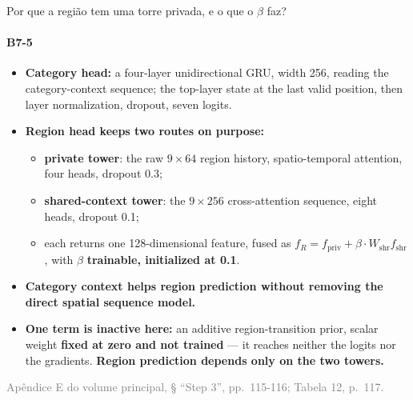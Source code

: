 \documentclass{beamer}
\begin{document}
\begin{frame}[noframenumbering]{Por que a região tem uma torre privada, e o que o $\beta$ faz?}
    \framesubtitle{B7-5}
    \hypertarget{b75}{}
    \small\begin{itemize}\setlength{\itemsep}{0pt}\setlength{\parskip}{0pt}
        \item \textbf{Category head:} a four-layer unidirectional GRU, width 256, reading the category-context sequence; the top-layer state at the last valid position, then layer normalization, dropout, seven logits.
        \item \textbf{Region head keeps two routes on purpose:}
        \begin{itemize}\footnotesize\setlength{\itemsep}{0pt}\setlength{\parskip}{0pt}
            \item \textbf{private tower}: the raw $9\times64$ region history, spatio-temporal attention, four heads, dropout 0.3;
            \item \textbf{shared-context tower}: the $9\times256$ cross-attention sequence, eight heads, dropout 0.1;
            \item each returns one 128-dimensional feature, fused as $f_R = f_{\mathrm{priv}} + \beta \cdot W_{\mathrm{shr}} f_{\mathrm{shr}}$, with $\beta$ \textbf{trainable, initialized at 0.1}.
        \end{itemize}
        \item \textbf{Category context helps region prediction without removing the direct spatial sequence model.}
        \item \textbf{One term is inactive here:} an additive region-transition prior, scalar weight \textbf{fixed at zero and not trained} --- it reaches neither the logits nor the gradients. \textbf{Region prediction depends only on the two towers.}
    \end{itemize}
    \vfill
    {\scriptsize
    \begin{minipage}[b]{0.775\linewidth}\raggedright\textcolor{gray}{Apêndice E do volume principal, § ``Step 3'', pp.~115-116; Tabela 12, p.~117.}\end{minipage}\hfill
    \begin{minipage}[b]{0.20\linewidth}\raggedleft \hyperlink{b0}{}\end{minipage}}
\end{frame}
\end{document}
